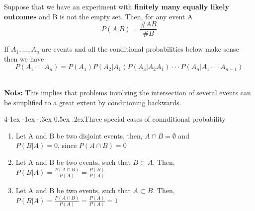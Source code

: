 \documentclass{tufte-handout}
\makeatletter
\renewcommand{\paragraph}{\@startsection{paragraph}%
    {4}{\z@}{-1ex \@plus -1ex \@minus -.3ex}%
    {0.5ex \@plus .2ex}{\normalfont\normalsize\bfseries}}
\makeatother
\begin{document}
        \begin{Theorem}
            Suppose that we have an experiment with \textbf{finitely many equally likely outcomes} and B is not the empty set.
            Then, for any event A 
            \[P(A|B ) = \frac{\#AB }{\#B}\]
        \end{Theorem}

        

        \begin{Theorem}
            If $ A_{1}, ... , A_{n } $ are events and all the conditional probabilities below make sense then we 
            have
            \[P(A_{1}\cdot \cdot \cdot A_{n })=P(A_{1})P(A_{2}|A_{1})P(A_{3}|A_{2}A_{1})\cdot \cdot \cdot P(A_{n }|A_{1}\cdot \cdot \cdot A_{n-1}) \]\\
        \end{Theorem}
        
        \textbf{Nots:} This implies that problems involving the intersection of several events can be 
        simplified to a great extent by conditioning backwards.

        \paragraph{Three special cases of connditional probability}
        \begin{enumerate}
            \item Let A and B be two disjoint events, then, $ A \cap B = \emptyset $ and \\
                    $ P(B|A)=0 $, since $ P(A\cap B ) = 0 $ 
            \item Let A and B be two events, such that $ B \subset A  $. Then, \\
            $ P(B|A ) = \frac{P(A \cap B )}{P(A)} = \frac{P(B )}{P(A )} $ 
            \item Let A and B be two events, such that $ A \subset B  $. Then, \\
            $ P(B|A ) = \frac{P(A \cap B )}{P(A)} = \frac{P(A )}{P(A )} = 1 $ 
            
        \end{enumerate}
\end{document}
